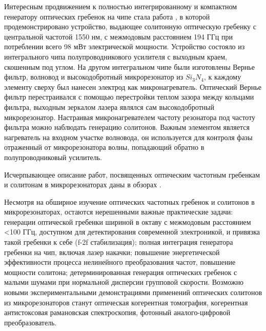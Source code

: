 Интересным продвижением к полностью интегрированному и компактном генератору оптических гребенок на чипе стала работа \cite{Stern2018}, в которой продемонстрировано устройство, выдающее солитонную оптическую гребенку с центральной частотой 1550 нм, с межмодовым расстоянием 194 ГГц при потреблении всего 98 мВт электрической мощности. Устройство состояло из интегрального чипа полупроводникового усилителя с выходным краем, скошенным под углом. На другом интегральном чипе были изготовлены Вернье фильтр, волновод и высокодобротный микрорезонатор из $Si_3N_4$, к каждому элементу сверху был нанесен электрод как микронагреватель. Оптический Вернье фильтр перестраивался с помощью перестройки теплом зазора между кольцами фильтра, выходным зеркалом лазера являлся сам высокодобротный микрорезонатор. Настраивая микронагревателем частоту резонатора под частоту фильтра можно наблюдать генерацию солитонов. Важным элементом является нагреватель на входном участке волновода, он используется для контроля фазы отраженный от микрорезонатора волны, попадающий обратно в полупроводниковый усилитель.

Исчерпывающее описание работ, посвященных оптическим частотным гребенкам и солитонам в микрорезонаторах даны в обзорах \cite{Kippenberg2011,ASavchenkov2016,ChemboY2016,PASQUAZI20181,Kippenbergeaan8083}.

Несмотря на обширное изучение оптических частотных гребенок и солитонов в микрорезонаторах, остаются нерешенными важные практические задачи: генерации оптической гребенки шириной в октаву с межмодовым расстоянием <100 ГГц, доступном для детектирования современной электроникой, и привязка такой гребенки к себе (f-2f стабилизация); полная интеграция генератора гребенки на чип, включая лазер накачки; повышение энергетической эффективности процесса нелинейного преобразования частот, повышение мощности солитона; детерминированная генерация оптических гребенок с малыми шумами при нормальной дисперсии групповой скорости. Возможно новыми экспериментальными демонстрациями применений оптических солитонов из микрорезонаторов станут оптическая когерентная томография, когерентная антистоксовая рамановская спектроскопия, фотонный аналого-цифровой преобразователь.


